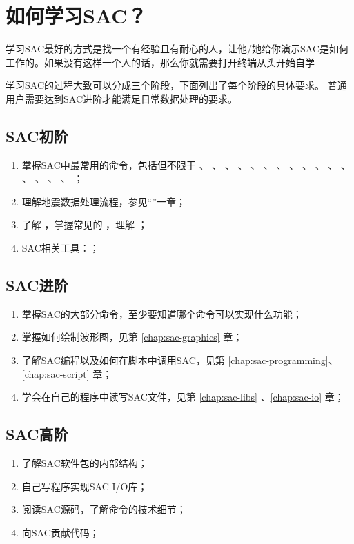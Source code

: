 \section{如何学习SAC？}
学习SAC最好的方式是找一个有经验且有耐心的人，让他/她给你演示SAC是如何
工作的。如果没有这样一个人的话，那么你就需要打开终端从头开始自学

学习SAC的过程大致可以分成三个阶段，下面列出了每个阶段的具体要求。
普通用户需要达到SAC进阶才能满足日常数据处理的要求。

\subsection*{SAC初阶}
\begin{enumerate}
    \item 掌握SAC中最常用的命令，包括但不限于
            、
            、
            、
            、
            、
            、
            、
            、
            、
            、
            、
            、
            、
            、
            、
            、
            ；
        \item 理解地震数据处理流程，参见``''一章；
        \item 了解 ，掌握常见的
            ，理解 ；
        \item SAC相关工具：；
\end{enumerate}

\subsection*{SAC进阶}
\begin{enumerate}
\item 掌握SAC的大部分命令，至少要知道哪个命令可以实现什么功能；
\item 掌握如何绘制波形图，见第 \ref{chap:sac-graphics} 章；
\item 了解SAC编程以及如何在脚本中调用SAC，见第 \ref{chap:sac-programming}、\ref{chap:sac-script} 章；
\item 学会在自己的程序中读写SAC文件，见第 \ref{chap:sac-libs} 、\ref{chap:sac-io} 章；
\end{enumerate}

\subsection*{SAC高阶}
\begin{enumerate}
\item 了解SAC软件包的内部结构；
\item 自己写程序实现SAC I/O库；
\item 阅读SAC源码，了解命令的技术细节；
\item 向SAC贡献代码；
\end{enumerate}

